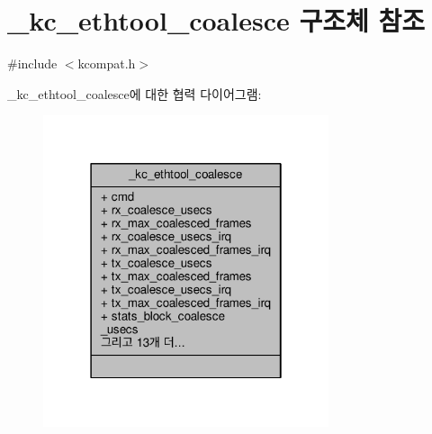 \hypertarget{struct__kc__ethtool__coalesce}{}\section{\+\_\+kc\+\_\+ethtool\+\_\+coalesce 구조체 참조}
\label{struct__kc__ethtool__coalesce}


{\ttfamily \#include $<$kcompat.\+h$>$}



\+\_\+kc\+\_\+ethtool\+\_\+coalesce에 대한 협력 다이어그램\+:
\nopagebreak
\begin{figure}[H]
\begin{center}
\leavevmode
\includegraphics[width=238pt]{struct__kc__ethtool__coalesce__coll__graph}
\end{center}
\end{figure}

